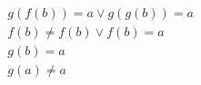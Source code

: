\begin{align*}
%
& g(f(b)) = a \lor g(g(b)) = a
~\\~
& f(b)  \neq  f(b) \lor f(b) = a
~\\~
& g(b) = a
~\\~
& g(a)  \neq  a
%
\end{align*}

